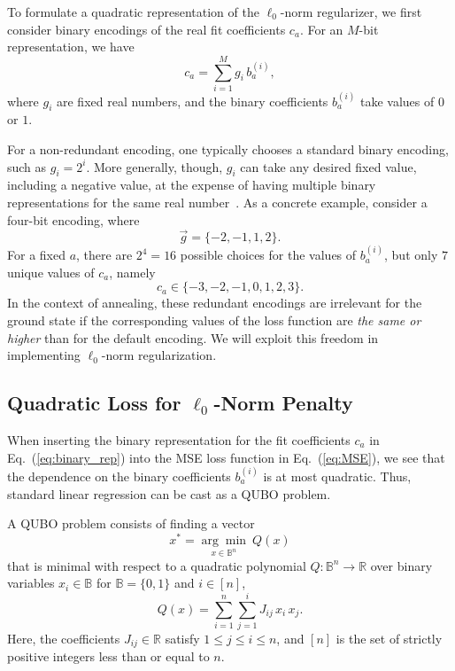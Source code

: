 \documentclass[aps,prd,twocolumn, superscriptaddress,preprintnumbers, nofootinbib,longbibliography,floatfix]{revtex4-2}
\DeclareRobustCommand{\Eq}[1]{Eq.~(\ref{#1})}
\begin{document}
To formulate a quadratic representation of the $\ell_0$-norm regularizer, we first consider binary encodings of the real fit coefficients $c_a$.
%
For an $M$-bit representation, we have
%
\begin{equation}
\label{eq:binary_rep}
c_a = \sum_{i = 1}^M g_i \, b^{(i)}_a,
\end{equation} 
%
where $g_i$ are fixed real numbers, and the binary coefficients $b^{(i)}_a$ take values of $0$ or $1$.

For a non-redundant encoding, one typically chooses a standard binary encoding, such as $g_i = 2^i$.
%
More generally, though, $g_i$ can take any desired fixed value, including a negative value, at the expense of having multiple binary representations for the same real number~\cite{Phatak_1994}. 
%
As a concrete example, consider a four-bit encoding, where
%
\begin{equation}
\label{eq:example_redundant_g}
\vec{g} = \{-2,-1,1,2\}.
\end{equation}
%
For a fixed $a$, there are $2^4 = 16$ possible choices for the values of $b_a^{(i)}$, but only $7$ unique values of $c_a$, namely
%
\begin{equation}
\label{eq:example_redundant_ca}
c_a \in \{-3,-2,-1,0,1,2,3\}.
\end{equation}
%
In the context of annealing, these redundant encodings are irrelevant for the ground state if the corresponding values of the loss function are \emph{the same or higher} than for the default encoding.
%
We will exploit this freedom in implementing $\ell_0$-norm regularization.


\subsection{Quadratic Loss for $\ell_0$-Norm Penalty}
\label{sec:QUBO}

When inserting the binary representation for the fit coefficients $c_a$ in \Eq{eq:binary_rep} into the MSE loss function in \Eq{eq:MSE}, we see that the dependence on the binary coefficients $b^{(i)}_a$ is at most quadratic. Thus, standard linear regression can be cast as a QUBO problem.

A QUBO problem consists of finding a vector
\begin{equation}
x^*=\underset{x\in\mathbb{B}^n}{\arg\min} ~Q(x)
\end{equation}
that is minimal with respect to a quadratic polynomial $Q:\mathbb{B}^n\rightarrow\mathbb{R}$ over binary variables $x_i\in\mathbb{B}$ for $\mathbb{B}=\lbrace 0,1\rbrace$ and $i\in[n]$,
\begin{equation}
Q(x) = \sum_{i=1}^n \sum_{j=1}^i J_{ij} \, x_i \, x_j.
\label{eq:QUBO}
\end{equation}
Here, the coefficients $J_{ij}\in\mathbb{R}$ satisfy $1\leq j\leq i\leq n$, and $\left[n\right]$ is the set of strictly positive integers less than or equal to $n$.
\end{document}
